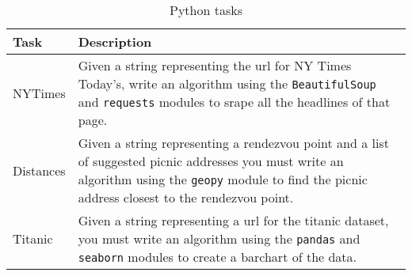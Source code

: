 \begin{table}
\caption{Python tasks}
\begin{scriptsize}
\vspace{-1mm}  


\begin{threeparttable}    
\begin{tabular}{ll}
\hline    
\textbf{Task} & \textbf{Description}  \\ 
\hline
\hline
NYTimes & 
\parbox[l][1cm][c]{11cm}{Given a string representing the url for NY Times Today's,
write an algorithm using the \texttt{BeautifulSoup} and \texttt{requests} modules to srape all the headlines of that page.}  
\\
%
Distances & 
\parbox[l][1.2cm][c]{11cm}{Given a string representing a rendezvou point and a list of suggested picnic addresses
you must write an algorithm using the \texttt{geopy} module to find the  picnic address closest to the rendezvou point.}  \\ 
%
Titanic & 
\parbox[l][1cm][c]{11cm}{Given a string representing a url for the titanic dataset,
you must write an algorithm using the \texttt{pandas} and \texttt{seaborn} modules to create a barchart of the data.}   \\
\hline
\end{tabular}
\end{threeparttable}    
\end{scriptsize}
\smallskip
\label{tbl:python-tasks-modules}
\end{table}
    
